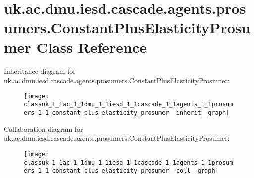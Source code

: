 \hypertarget{classuk_1_1ac_1_1dmu_1_1iesd_1_1cascade_1_1agents_1_1prosumers_1_1_constant_plus_elasticity_prosumer}{\section{uk.\-ac.\-dmu.\-iesd.\-cascade.\-agents.\-prosumers.\-Constant\-Plus\-Elasticity\-Prosumer Class Reference}
\label{classuk_1_1ac_1_1dmu_1_1iesd_1_1cascade_1_1agents_1_1prosumers_1_1_constant_plus_elasticity_prosumer}
}


Inheritance diagram for uk.\-ac.\-dmu.\-iesd.\-cascade.\-agents.\-prosumers.\-Constant\-Plus\-Elasticity\-Prosumer\-:\nopagebreak
\begin{figure}[H]
\begin{center}
\leavevmode
\texttt{[image: classuk\_1\_1ac\_1\_1dmu\_1\_1iesd\_1\_1cascade\_1\_1agents\_1\_1prosumers\_1\_1\_constant\_plus\_elasticity\_prosumer\_\_inherit\_\_graph]}
\end{center}
\end{figure}


Collaboration diagram for uk.\-ac.\-dmu.\-iesd.\-cascade.\-agents.\-prosumers.\-Constant\-Plus\-Elasticity\-Prosumer\-:\nopagebreak
\begin{figure}[H]
\begin{center}
\leavevmode
\texttt{[image: classuk\_1\_1ac\_1\_1dmu\_1\_1iesd\_1\_1cascade\_1\_1agents\_1\_1prosumers\_1\_1\_constant\_plus\_elasticity\_prosumer\_\_coll\_\_graph]}
\end{center}
\end{figure}
